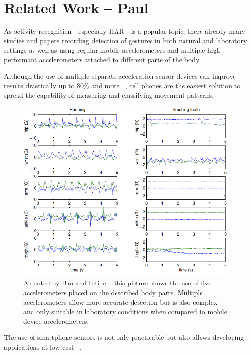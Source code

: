 \documentclass[conference]{IEEEtran}
\begin{document}
\section{Related Work -- Paul}
As activity recognition - especially \ac{HAR} - is a popular topic, there already many studies and papers recording detection of gestures in both natural and laboratory settings as well as using regular mobile accelerometers and multiple high-performant accelerometers attached to different parts of the body.

Although the use of multiple separate acceleration sensor devices can improve results drastically up to 80\% and more ~\cite{Bao2004}, cell phones are the easiest solution to spread the capability of measuring and classifying movement patterns.
\begin{figure}[!htb]
\centering
\includegraphics[width=\linewidth]{multiple_accelerometers}
\caption{As noted by Bao and Intille ~\cite{Bao2004} this picture shows the use of five accelerometers placed on the described body parts. Multiple accelerometers allow more accurate detection but is also complex and only suitable in laboratory conditions when compared to mobile device accelerometers.}
\label{fig:multipleAccelerometers}
\end{figure}
The use of smartphone sensors is not only practicable but also allows developing applications at low-cost ~\cite{Brezmes2009}.
\end{document}
